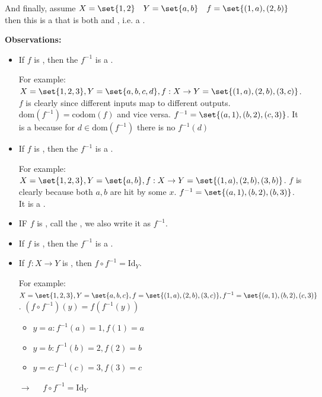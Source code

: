 And finally, assume $X=\set{1,2} \quad Y=\set{a,b} \quad f=\set{(1,a),(2,b)}$ then this is a  that is both  and , i.e. a  .



\textbf{Observations:}
\begin{itemize}
\item If $f$ is , then the   $f^{-1}$ is a .

For example: $X = \set{1,2,3}, Y = \set{a,b,c,d}, f:X \to Y = \set{(1,a),(2,b),(3,c)}$. $f$ is clearly  since different inputs map to different outputs. $\text{dom}(f^{-1}) = \text{codom}(f)$ and vice versa. $f^{-1} = \set{(a,1),(b,2),(c,3)}$. It is a  because for $d \in \text{dom}(f^{-1})$ there is no $f^{-1} (d)$
\item If $f$ is , then the   $f^{-1}$ is a  . 

For example: $X = \set{1,2,3}, Y = \set{a,b}, f:X \to Y = \set{(1,a),(2,b),(3,b)}$. $f$ is clearly  because both $a,b$ are hit by some $x$. $f^{-1} = \set{(a,1),(b,2),(b,3)}$. It is a .
\item IF $f$ is , call the   , we also write it as $f^{-1}$.
\item If $f$ is , then the  $f^{-1}$ is a .
\item If $f:X \to Y$ is , then $f \circ f^{-1} = \text{Id}_{Y}$.

For example: $X = \set{1,2,3}, Y = \set{a,b,c}, f = \set{(1,a),(2,b),(3,c)}, f^{-1} = \set{(a,1),(b,2),(c,3)}$. $(f \circ f^{-1})(y) = f(f^{-1}(y))$
\begin{itemize}
    \item $y = a: f^{-1} (a) = 1, f(1) = a$
    \item $y = b: f^{-1} (b) = 2, f(2) = b$
    \item $y = c: f^{-1} (c) = 3, f(3) = c$
\end{itemize}
$\to \quad$ $f \circ f^{-1} = \text{Id}_{Y}$
\end{itemize}

